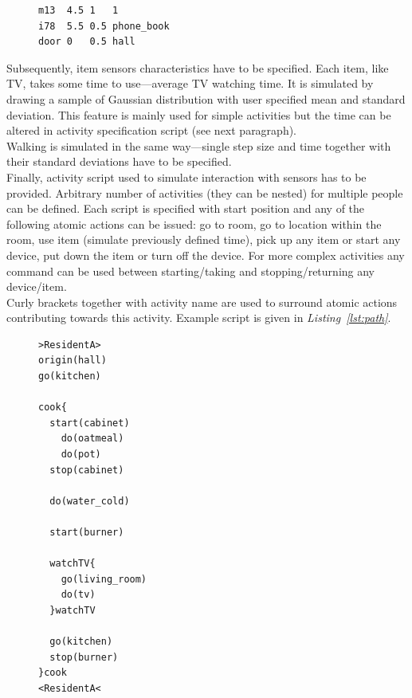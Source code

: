 \documentclass[12pt, a4paper, pdflatex, leqno, twoside, openright]{report}
\begin{document}
\begin{figure}[htb]
  \begin{lstlisting}
m13  4.5 1   1
i78  5.5 0.5 phone_book
door 0   0.5 hall
  \end{lstlisting}
\end{figure}

Subsequently, item sensors characteristics have to be specified. Each item, like TV, takes some time to use---average TV watching time. It is simulated by drawing a sample of Gaussian distribution with user specified mean and standard deviation. This feature is mainly used for simple activities but the time can be altered in activity specification script (see next paragraph).\\
Walking is simulated in the same way---single step size and time together with their standard deviations have to be specified.\\

Finally, activity script used to simulate interaction with sensors has to be provided. Arbitrary number of activities (they can be nested) for multiple people can be defined. Each script is specified with start position and any of the following atomic actions can be issued: go to room, go to location within the room, use item (simulate previously defined time), pick up any item or start any device, put down the item or turn off the device. For more complex activities any command can be used between starting/taking and stopping/returning any device/item.\\
Curly brackets together with activity name are used to surround atomic actions contributing towards this activity. Example script is given in \emph{Listing~\ref{lst:path}}.\\

\begin{figure}[htb]
  \begin{lstlisting}
>ResidentA>
origin(hall)
go(kitchen)

cook{
  start(cabinet)
    do(oatmeal)
    do(pot)
  stop(cabinet)

  do(water_cold)

  start(burner)

  watchTV{
    go(living_room)
    do(tv)
  }watchTV

  go(kitchen)
  stop(burner)
}cook
<ResidentA<
  \end{lstlisting}
\end{figure}
\end{document}
